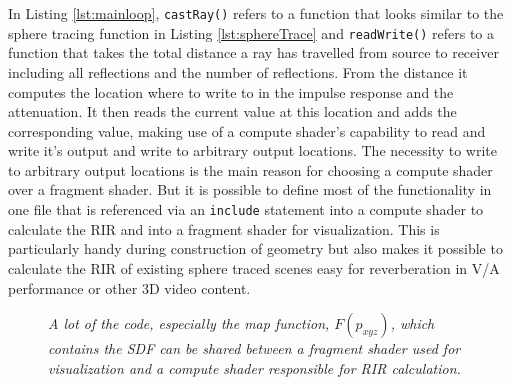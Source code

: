 \documentclass[twoside,a4paper]{article}
\begin{document}
In Listing \ref{lst:mainloop}, \texttt{castRay()} refers to a function that looks similar to the sphere tracing function in Listing \ref{lst:sphereTrace} and \texttt{readWrite()} refers to a function that takes the total distance a ray has travelled from source to receiver including all reflections and the number of reflections. From the distance it computes the location where to write to in the impulse response and the attenuation. It then reads the current value at this location and adds the corresponding value, making use of a compute shader's capability to read and write it's output and write to arbitrary output locations. The necessity to write to arbitrary output locations is the main reason for choosing a compute shader over a fragment shader. But it is possible to define most of the functionality in one file that is referenced via an \texttt{include} statement into a compute shader to calculate the RIR and into a fragment shader for visualization. This is particularly handy during construction of geometry but also makes it possible to calculate the RIR of existing sphere traced scenes easy for reverberation in V/A performance or other 3D video content.


\begin{figure}[ht]
\center
{}
\caption{\label{fig:bd_shaders}{\it A lot of the code, especially the map function, $F(p_{xyz})$, which contains the SDF can be shared between a fragment shader used for visualization and a compute shader responsible for RIR calculation.}}
\end{figure}
\end{document}
